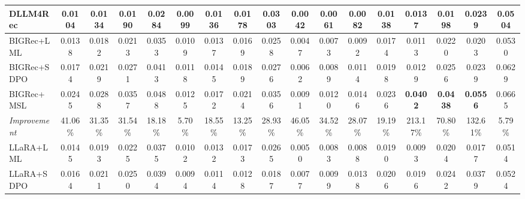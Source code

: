 \documentclass[sigconf,natbib=true]{acmart}
\begin{document}
\begin{table}[]
{\begin{tabular}{@{}l|cccc|cccc|cccc|cccc@{}}
DLLM4Rec                 & 0.0104          & 0.0134          & 0.0190          & 0.0284          & 0.0099          & 0.0136          & 0.0178          & 0.0303          & 0.0042          & 0.0061          & 0.0082          & 0.0138          & 0.0137          & 0.0198          & 0.0239          & 0.0504          \\ \midrule
BIGRec+LML               & 0.0138          & 0.0182          & 0.0213          & 0.0353          & 0.0109          & 0.0137          & 0.0169          & 0.0258          & 0.0047          & 0.0073          & 0.0092          & 0.0174          & 0.0113          & 0.0220          & 0.0203          & 0.0530          \\
BIGRec+SDPO              & 0.0174          & 0.0219          & 0.0271          & 0.0413          & 0.0118          & 0.0145          & 0.0189          & 0.0276          & 0.0062          & 0.0089          & 0.0114          & 0.0198          & 0.0129          & 0.0256          & 0.0239          & 0.0629          \\ \midrule
\rowcolor[HTML]{C0F1FF} 
BIGRec+MSL               & 0.0245          & 0.0288          & 0.0357          & 0.0488          & 0.0125          & 0.0172          & 0.0214          & 0.0356          & 0.0091          & 0.0120          & 0.0146          & 0.0236          & \textbf{0.0402} & \textbf{0.0438} & \textbf{0.0556} & 0.0665          \\ \midrule
\rowcolor[HTML]{C0F1FF} 
\textit{Improvement}     & 41.06\%          & 31.35\%          & 31.54\%          & 18.18\%          & 5.70\%           & 18.55\%          & 13.25\%          & 28.93\%          & 46.05\%          & 34.52\%          & 28.07\%          & 19.19\%          & 213.17\%         & 70.80\%          & 132.61\%         & 5.79\%           \\ \midrule
LLaRA+LML                & 0.0145          & 0.0193          & 0.0225          & 0.0375          & 0.0102          & 0.0132          & 0.0173          & 0.0265          & 0.0050          & 0.0083          & 0.0088          & 0.0190          & 0.0093          & 0.0204          & 0.0177          & 0.0514          \\
LLaRA+SDPO               & 0.0164          & 0.0211          & 0.0250          & 0.0394          & 0.0094          & 0.0114          & 0.0128          & 0.0187          & 0.0077          & 0.0099          & 0.0138          & 0.0206          & 0.0196          & 0.0242          & 0.0379          & 0.0524          \\ \midrule

\end{tabular}}
\end{table}
\end{document}
